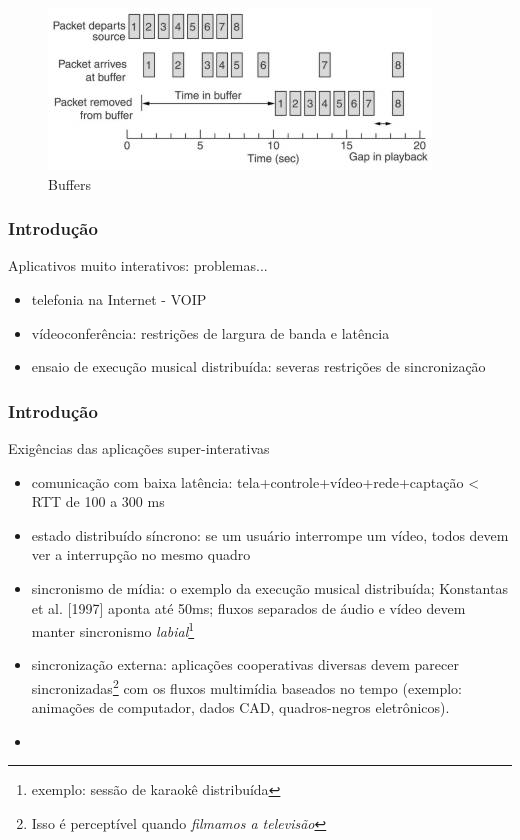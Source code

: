\documentclass[]{beamer}
\begin{document}
\begin{frame}
  \begin{figure}[hbtp]
   \caption{Buffers}
   \begin{center}
    \includegraphics[scale=1.3]{buffer.jpg}
   \end{center}
  \end{figure}
\end{frame}


\begin{frame}
  \frametitle{Introdução}
Aplicativos muito interativos: problemas...
\begin{itemize}
  \item telefonia na Internet - VOIP
  \item vídeoconferência: restrições de largura de banda e latência
  \item ensaio de execução musical distribuída: severas restrições de sincronização
\end{itemize}
\end{frame}

\begin{frame}
  \frametitle{Introdução}
Exigências das aplicações super-interativas
\begin{itemize}
  \item comunicação com baixa latência:
 tela+controle+vídeo+rede+captação < RTT de 100 a 300 ms
  \item estado distribuído síncrono: se um usuário interrompe um vídeo, todos devem 
ver a interrupção no mesmo quadro
  \item sincronismo de mídia: o exemplo da execução musical distribuída; 
Konstantas et al. [1997] aponta até 50ms; fluxos separados de áudio e vídeo devem manter
sincronismo \emph{labial}\footnote{exemplo: sessão de karaokê distribuída}
  \item sincronização externa: aplicações cooperativas diversas devem parecer 
sincronizadas\footnote{Isso é perceptível quando \emph{filmamos a televisão}}
com os fluxos multimídia baseados no tempo (exemplo: animações de computador, dados CAD, 
quadros-negros eletrônicos).   
  \item 
\end{itemize}
\end{frame}
\end{document}
